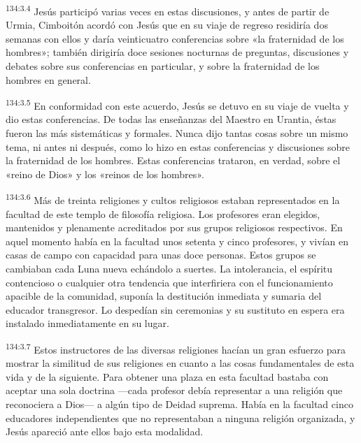 \par
\textsuperscript{134:3.4} Jesús participó varias veces en estas discusiones, y antes de partir de Urmia, Cimboitón acordó con Jesús que en su viaje de regreso residiría dos semanas con ellos y daría veinticuatro conferencias sobre «la fraternidad de los hombres»; también dirigiría doce sesiones nocturnas de preguntas, discusiones y debates sobre sus conferencias en particular, y sobre la fraternidad de los hombres en general.

\par
\textsuperscript{134:3.5} En conformidad con este acuerdo, Jesús se detuvo en su viaje de vuelta y dio estas conferencias. De todas las enseñanzas del Maestro en Urantia, éstas fueron las más sistemáticas y formales. Nunca dijo tantas cosas sobre un mismo tema, ni antes ni después, como lo hizo en estas conferencias y discusiones sobre la fraternidad de los hombres. Estas conferencias trataron, en verdad, sobre el «reino de Dios» y los «reinos de los hombres».

\par
\textsuperscript{134:3.6} Más de treinta religiones y cultos religiosos estaban representados en la facultad de este templo de filosofía religiosa. Los profesores eran elegidos, mantenidos y plenamente acreditados por sus grupos religiosos respectivos. En aquel momento había en la facultad unos setenta y cinco profesores, y vivían en casas de campo con capacidad para unas doce personas. Estos grupos se cambiaban cada Luna nueva echándolo a suertes. La intolerancia, el espíritu contencioso o cualquier otra tendencia que interfiriera con el funcionamiento apacible de la comunidad, suponía la destitución inmediata y sumaria del educador transgresor. Lo despedían sin ceremonias y su sustituto en espera era instalado inmediatamente en su lugar.

\par
\textsuperscript{134:3.7} Estos instructores de las diversas religiones hacían un gran esfuerzo para mostrar la similitud de sus religiones en cuanto a las cosas fundamentales de esta vida y de la siguiente. Para obtener una plaza en esta facultad bastaba con aceptar una sola doctrina ---cada profesor debía representar a una religión que reconociera a Dios--- a algún tipo de Deidad suprema. Había en la facultad cinco educadores independientes que no representaban a ninguna religión organizada, y Jesús apareció ante ellos bajo esta modalidad.

